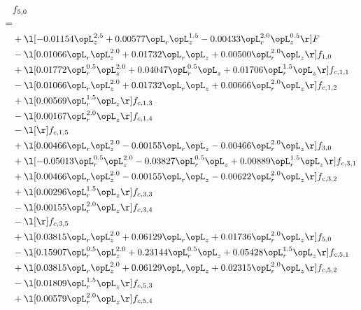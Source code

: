 \begin{alignat}{2} 
\label{eq:f_50_1} 
& f_{5,0} \nonumber \\ 
 = \\ 
& + \l[  -0.01154 \opL_z^{2.5} +  0.00577 \opL_r \opL_z^{1.5}   -0.00433 \opL_r^{2.0} \opL_z^{0.5}  \r] F \nonumber \\ 
& - \l[  0.01066 \opL_r \opL_z^{2.0} +  0.01732 \opL_r \opL_z +  0.00500 \opL_r^{2.0} \opL_z  \r] f_{1,0} \nonumber \\ 
& + \l[  0.01772 \opL_r^{0.5} \opL_z^{2.0} +  0.04047 \opL_r^{0.5} \opL_z +  0.01706 \opL_r^{1.5} \opL_z  \r] f_{c,1,1} \nonumber \\ 
& - \l[  0.01066 \opL_r \opL_z^{2.0} +  0.01732 \opL_r \opL_z +  0.00666 \opL_r^{2.0} \opL_z  \r] f_{c,1,2} \nonumber \\ 
& + \l[  0.00569 \opL_r^{1.5} \opL_z  \r] f_{c,1,3} \nonumber \\ 
& - \l[  0.00167 \opL_r^{2.0} \opL_z  \r] f_{c,1,4} \nonumber \\ 
& - \l[  \r] f_{c,1,5} \nonumber \\ 
& + \l[  0.00466 \opL_r \opL_z^{2.0}   -0.00155 \opL_r \opL_z   -0.00466 \opL_r^{2.0} \opL_z  \r] f_{3,0} \nonumber \\ 
& + \l[  -0.05013 \opL_r^{0.5} \opL_z^{2.0}   -0.03827 \opL_r^{0.5} \opL_z +  0.00889 \opL_r^{1.5} \opL_z  \r] f_{c,3,1} \nonumber \\ 
& + \l[  0.00466 \opL_r \opL_z^{2.0}   -0.00155 \opL_r \opL_z   -0.00622 \opL_r^{2.0} \opL_z  \r] f_{c,3,2} \nonumber \\ 
& + \l[  0.00296 \opL_r^{1.5} \opL_z  \r] f_{c,3,3} \nonumber \\ 
& - \l[  0.00155 \opL_r^{2.0} \opL_z  \r] f_{c,3,4} \nonumber \\ 
& - \l[  \r] f_{c,3,5} \nonumber \\ 
& + \l[  0.03815 \opL_r \opL_z^{2.0} +  0.06129 \opL_r \opL_z +  0.01736 \opL_r^{2.0} \opL_z  \r] f_{5,0} \nonumber \\ 
& - \l[  0.15907 \opL_r^{0.5} \opL_z^{2.0} +  0.23144 \opL_r^{0.5} \opL_z +  0.05428 \opL_r^{1.5} \opL_z  \r] f_{c,5,1} \nonumber \\ 
& + \l[  0.03815 \opL_r \opL_z^{2.0} +  0.06129 \opL_r \opL_z +  0.02315 \opL_r^{2.0} \opL_z  \r] f_{c,5,2} \nonumber \\ 
& - \l[  0.01809 \opL_r^{1.5} \opL_z  \r] f_{c,5,3} \nonumber \\ 
& + \l[  0.00579 \opL_r^{2.0} \opL_z  \r] f_{c,5,4} \nonumber \\ 

\end{alignat}
